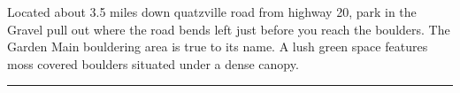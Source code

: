\begin{multicols}{2}

\begin{minipage}{\columnwidth}
Located about 3.5 miles down quatzville road from highway 20, park in the Gravel pull out where the road bends left just before you reach the boulders. The Garden Main bouldering area is true to its name. A lush green space features moss covered boulders situated under a dense canopy.
\end{minipage}

\end{multicols}
\rule{\textwidth}{1pt}

